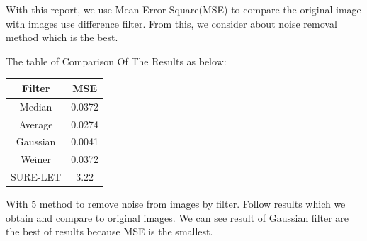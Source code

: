 \documentclass[10pt]{article}
\begin{document}
With this report, we use Mean Error Square(MSE) to compare the original image with images use difference filter. From this, we consider about noise removal method which is the best.

The table of Comparison Of The Results as below:

\begin{center}
\begin{tabular}{|c|c|}
	\hline 
	Filter & MSE \\ 
	\hline 
	Median & 0.0372 \\ 
	\hline 
	Average & 0.0274 \\ 
	\hline 
	Gaussian & 0.0041 \\ 
	\hline 
	Weiner & 0.0372 \\ 
	\hline 
	SURE-LET & 3.22 \\ 
    \hline 
\end{tabular} 
\end{center} 


With 5 method to remove noise from images by filter. Follow results which we obtain and compare to original images. We can see result of Gaussian filter are the best of results because MSE is the smallest.
\end{document}
